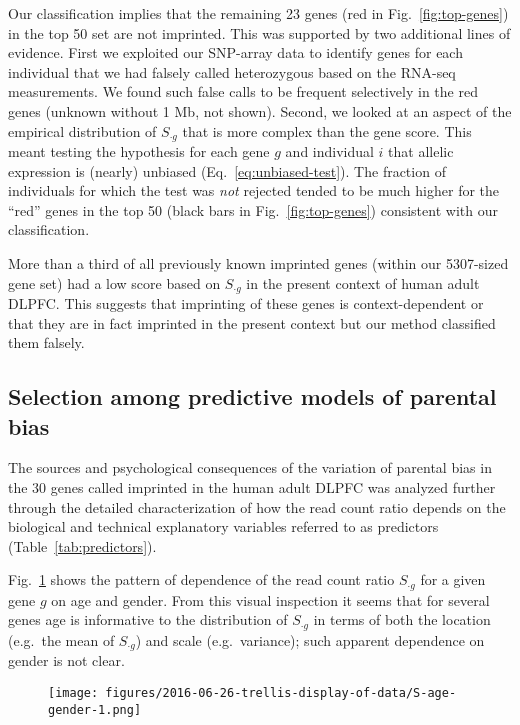 \documentclass[letterpaper]{article}
\begin{document}
Our classification implies that the remaining 23 genes (red in
Fig.~\ref{fig:top-genes}) in the top 50 set are not imprinted.  This was
supported by two additional lines of evidence.  First we exploited our
SNP-array data to identify genes for each individual that we had falsely
called heterozygous based on the RNA-seq measurements.  We found such false
calls to be frequent selectively in the red genes (unknown without 1 Mb, not
shown).  Second, we looked at an aspect of the empirical distribution of
\(S_{\cdot g}\) that is more complex than the gene score.  This meant testing
the hypothesis for each gene \(g\) and individual \(i\) that allelic
expression is (nearly) unbiased (Eq.~\ref{eq:unbiased-test}).  The fraction of
individuals for which the test was \emph{not} rejected tended to be much
higher for the ``red'' genes in the top 50 (black bars in
Fig.~\ref{fig:top-genes}) consistent with our classification.

More than a third of
all previously known imprinted genes (within our 5307-sized gene set) had a low score
based on \(S_{\cdot g}\) in the present context of human adult DLPFC.  This
suggests that imprinting of these genes is context-dependent or that they are
in fact imprinted in the present context but our method classified them
falsely.

\subsection{Selection among predictive models of parental bias}
\label{sec:results-regression}

The sources and psychological consequences of the variation of parental bias
in the 30 genes called imprinted in the human adult DLPFC was analyzed further through the detailed
characterization of how the read count ratio depends on the biological and
technical explanatory variables referred to as predictors
(Table~\ref{tab:predictors}).

Fig.~\ref{fig:S-age-gender} shows the pattern of dependence of
the read count ratio \(S_{\cdot g}\) for a given gene \(g\) on age and gender.  From
this visual inspection it seems that for several genes age is informative to
the distribution of \(S_{\cdot g}\) in terms of both the location (e.g.~the mean of
\(S_{\cdot g}\)) and scale (e.g.~variance); such apparent dependence on gender is not
clear.

\begin{figure}
\begin{center}
\texttt{[image: figures/2016-06-26-trellis-display-of-data/S-age-gender-1.png]}
\caption{}
\label{fig:S-age-gender}
\end{center}
\end{figure}
\end{document}
